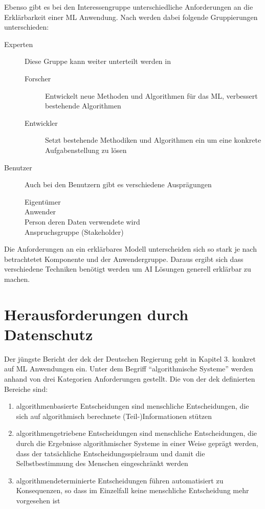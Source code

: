 \documentclass[
  12pt, %
  a4paper, %
  oneside, %
  openany, 
  numbers=noenddot, %
  BCOR=5mm, %
  parskip=half*, %
  thesis, %
]{bfhbook}
\begin{document}
Ebenso gibt es bei den Interessengruppe unterschiedliche Anforderungen an die Erklärbarkeit einer ML Anwendung. Nach \parencite{Ras2018} werden dabei folgende Gruppierungen unterschieden:
\begin{description}
  \item[Experten]
  Diese Gruppe kann weiter unterteilt werden in
  	\begin{description}
  		\item[Forscher] Entwickelt neue Methoden und Algorithmen für das ML, verbessert bestehende Algorithmen
  		\item[Entwickler] Setzt bestehende Methodiken und Algorithmen ein um eine konkrete Aufgabenstellung zu lösen
	\end{description}
  \item[Benutzer]
  Auch bei den Benutzern gibt es verschiedene Ausprägungen
  	\begin{description}
  		\item[Eigentümer]
  		\item[Anwender]
  		\item[Person deren Daten verwendete wird]
  		\item[Anspruchsgruppe (Stakeholder)]
	\end{description}
\end{description}
Die Anforderungen an ein erklärbares Modell unterscheiden sich so stark je nach betrachtetet Komponente und der Anwendergruppe. Daraus ergibt sich dass verschiedene Techniken benötigt werden um AI Lösungen generell erklärbar zu machen.

\section{Herausforderungen durch Datenschutz}
Der jüngste Bericht der \acrfull{dek} der Deutschen Regierung \parencite{datenEthik} geht in Kapitel 3. konkret auf  \Gls{ML} Anwendungen ein.
\break
Unter dem Begriff ``algorithmische Systeme'' werden anhand von drei Kategorien Anforderungen gestellt.
\break
 Die von der  \acrshort{dek} definierten Bereiche sind:
 
 \begin{enumerate}
   \item  algorithmenbasierte Entscheidungen sind menschliche Entscheidungen, die sich auf algorithmisch berechnete (Teil-)Informationen stützen
   \item algorithmengetriebene Entscheidungen sind menschliche Entscheidungen, die durch die Ergebnisse algorithmischer Systeme in einer Weise geprägt werden, dass der tatsächliche Entscheidungsspielraum und damit die Selbstbestimmung des Menschen eingeschränkt werden
   \item  algorithmendeterminierte Entscheidungen führen automatisiert zu Konsequenzen, so dass im Einzelfall keine menschliche Entscheidung mehr vorgesehen ist
\end{enumerate}
\end{document}
